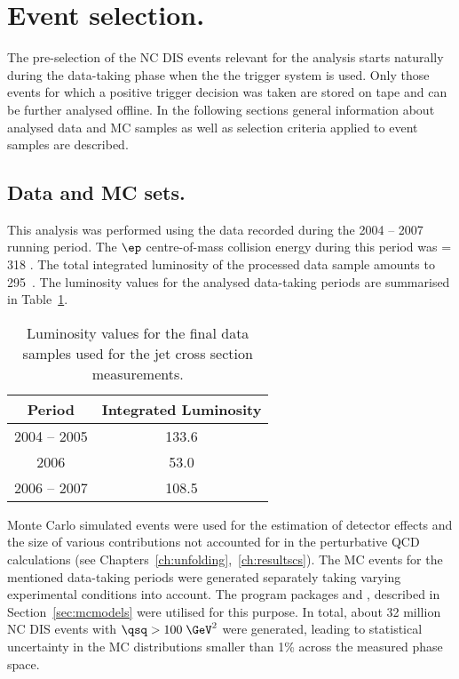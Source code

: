 \section{Event selection.}
The pre-selection of the NC DIS events relevant for the analysis starts naturally during the data-taking phase when the the \zeus trigger system is used. Only those events for which a positive trigger decision was taken are stored on tape and can be further analysed offline. In the following sections general information about analysed data and MC samples as well as selection criteria applied to event samples are described.

\subsection{Data and MC sets.}
This analysis was performed using the data recorded during the 2004 -- 2007 \hera running period. The $\ep$ centre-of-mass collision energy during this period was \sqs = 318 \GeV. The total integrated luminosity of the processed data sample amounts to 295~\invpb. The luminosity values for the analysed data-taking periods are summarised in Table~\ref{tab:selecteddatasample}.

\begin{table}[htpb!]
	\centering
		\begin{tabular}[h]{c|c}
		  \hline
			Period & Integrated Luminosity \\
			\hline \hline
			2004 -- 2005  & 133.6 \invpb  \\
			2006             & 53.0 \invpb   \\
			2006 -- 2007  & 108.5 \invpb \\
			\hline
		\end{tabular}
	\caption{Luminosity values for the final data samples used for the jet cross section measurements.}
	\label{tab:selecteddatasample}
\end{table}

Monte Carlo simulated events were used for the estimation of detector effects and the size of various contributions not accounted for in the perturbative QCD calculations (see Chapters~\ref{ch:unfolding},~\ref{ch:resultscs}). The MC events for the mentioned data-taking periods were generated separately taking varying experimental conditions into account. The program packages \lepto and \ariadne{}, described in Section~\ref{sec:mcmodels} were utilised for this purpose. In total, about 32 million NC DIS events with $\qsq > 100\;\GeV^2$ were generated, leading to statistical uncertainty in the MC distributions smaller than 1\% across the measured phase space. 

